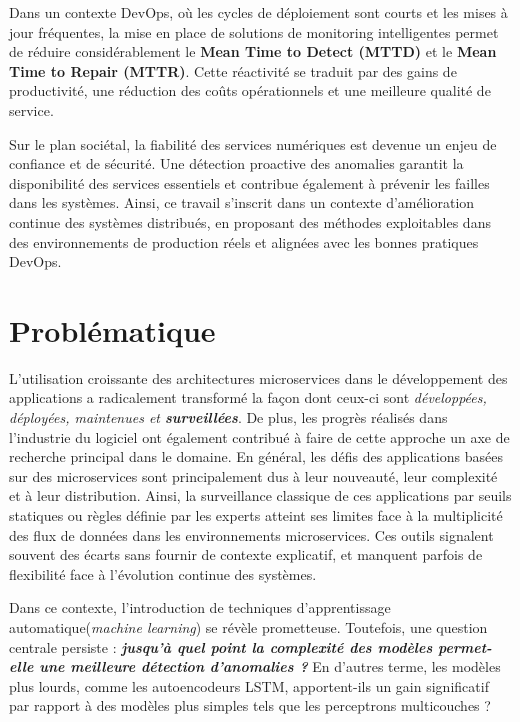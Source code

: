 \documentclass[a4paper,12pt]{report}
\begin{document}
Dans un contexte DevOps, où les cycles de déploiement sont courts et les mises à jour fréquentes, la mise en place de solutions de monitoring intelligentes permet de réduire considérablement le \textbf{Mean Time to Detect (MTTD)} et le \textbf{Mean Time to Repair (MTTR)}. Cette réactivité se traduit par des gains de productivité, une réduction des coûts opérationnels et une meilleure qualité de service.

Sur le plan sociétal, la fiabilité des services numériques est devenue un enjeu de confiance et de sécurité. Une détection proactive des anomalies garantit la disponibilité des services essentiels et contribue également à prévenir les failles dans les systèmes. Ainsi, ce travail s’inscrit dans un contexte d’amélioration continue des systèmes distribués, en proposant des méthodes exploitables dans des environnements de production réels et alignées avec les bonnes pratiques DevOps.

\section{Problématique}
L'utilisation croissante des architectures microservices dans le développement des applications a radicalement transformé la façon dont ceux-ci sont \textit{développées, déployées, maintenues et \textbf{surveillées}}. De plus, les progrès réalisés dans l'industrie du logiciel ont également contribué à faire de cette approche un axe de recherche principal dans le domaine. En général, les défis des applications basées sur des microservices sont principalement dus à leur nouveauté, leur complexité et à leur distribution. Ainsi, la surveillance classique de ces applications par seuils statiques ou règles définie par les experts atteint ses limites face à la multiplicité des flux de données dans les environnements microservices. Ces outils signalent souvent des écarts sans fournir de contexte explicatif, et manquent parfois de flexibilité face à l'évolution continue des systèmes.

Dans ce contexte, l'introduction de techniques d'apprentissage automatique(\textit{machine learning}) se révèle prometteuse. Toutefois, une question centrale persiste : \textit{\textbf{jusqu’à quel point la complexité des modèles permet-elle une meilleure détection d’anomalies ?}} En d'autres terme, les modèles plus lourds, comme les autoencodeurs LSTM, apportent-ils un gain significatif par rapport à des modèles plus simples tels que les perceptrons multicouches ?
\end{document}
